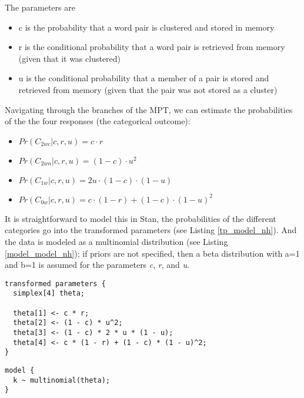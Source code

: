 \documentclass[10pt,a4paper]{article}
\begin{document}
The parameters are
\begin{itemize}
\item c is the probability that a word pair is clustered and stored in memory
\item r is the conditional probability that a word pair is retrieved from memory (given that it was clustered)
\item u is the conditional probability that a member of a pair is stored and retrieved from memory (given that the pair was not stored as a cluster)
\end{itemize}

Navigating through the branches of the MPT, we can estimate the probabilities of the the four responses (the categorical outcome):

\begin{itemize}
\item $Pr(C_{2wc}| c,r,u)= c \cdot r$
\item $Pr(C_{2wn}| c,r,u)= (1-c) \cdot u^2$
\item $Pr(C_{1w} | c,r,u)= 2u \cdot(1-c) \cdot(1-u)$
\item $Pr(C_{0w} | c,r,u)= c \cdot (1-r) +(1-c)\cdot(1-u)^2$

\end{itemize}

It is  straightforward to model this in Stan, the probabilities of the different categories go into the transformed parameters (see Listing \ref{tp_model_nh}). And the data is modeled as a multinomial distribution  (see Listing \ref{model_model_nh}); if priors are not specified, then a beta distribution with a=1 and b=1 is assumed for  the parameters \emph{c}, \emph{r}, and \emph{u}.

\lstset{
language=C++,
basicstyle=\small\sffamily,
numbers=left,
numberstyle=\tiny,
frame=tb,
columns=fullflexible,
showstringspaces=false
}
\begin{lstlisting}[caption=Probabilities of the responses in Stan;  simplex is a vector of non-negative values that sum to one.,
  label=tp_model_nh,
  float=h!]
transformed parameters {
  simplex[4] theta;

  theta[1] <- c * r;  
  theta[2] <- (1 - c) * u^2; 
  theta[3] <- (1 - c) * 2 * u * (1 - u); 
  theta[4] <- c * (1 - r) + (1 - c) * (1 - u)^2; 
}
\end{lstlisting}

\begin{lstlisting}[caption=The data is assumed to be produced by a multinomial distribution; priors for the parameters are beta distributions with a=1 and b=1.",
  label=model_model_nh,
  float=h!]
model {
  k ~ multinomial(theta);
}
\end{lstlisting}
\end{document}
